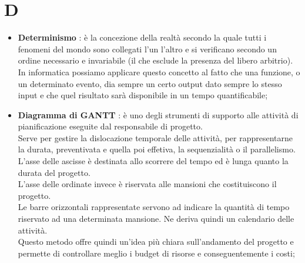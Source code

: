 % 
%
% 
%

\section{D}

\begin{itemize}
	\item \textbf{Determinismo} : è la concezione della realtà secondo la quale tutti i fenomeni del mondo sono collegati l’un l’altro e si verificano secondo un ordine necessario e invariabile (il che esclude la presenza del libero arbitrio). \\
In informatica possiamo applicare questo concetto al fatto che una funzione, o un determinato evento, dia sempre un certo output dato sempre lo stesso input e che quel risultato sarà disponibile in un tempo quantificabile;

	\item \textbf {Diagramma di GANTT} : è uno degli strumenti di supporto alle attività di pianificazione eseguite dal responsabile di progetto. \\
Serve per gestire la dislocazione temporale delle attività, per rappresentarne la durata, preventivata e quella poi effetiva, la sequenzialità o il parallelismo. \\
L'asse delle ascisse è destinata allo scorrere del tempo ed è lunga quanto la durata del progetto. \\
L'asse delle ordinate invece è riservata alle mansioni che costituiscono il progetto. \\
Le barre orizzontali rappresentate servono ad indicare la quantità di tempo riservato ad una determinata mansione. Ne deriva quindi un calendario delle attività. \\
Questo metodo offre quindi un'idea più chiara sull'andamento del progetto e permette di controllare meglio i budget di risorse e conseguentemente i costi;


\end{itemize}
